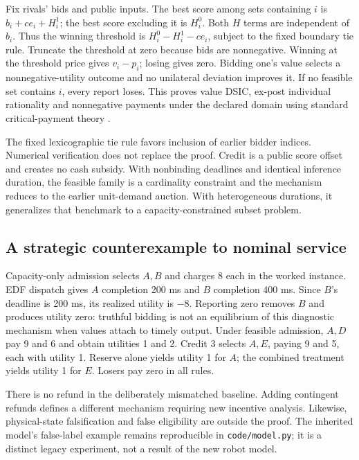 Fix rivals' bids and public inputs. The best score among sets containing $i$ is $b_i+ce_i+H_i^1$; the best score excluding it is $H_i^0$. Both $H$ terms are independent of $b_i$. Thus the winning threshold is $H_i^0-H_i^1-ce_i$, subject to the fixed boundary tie rule. Truncate the threshold at zero because bids are nonnegative. Winning at the threshold price gives $v_i-p_i$; losing gives zero. Bidding one's value selects a nonnegative-utility outcome and no unilateral deviation improves it. If no feasible set contains $i$, every report loses. This proves value DSIC, ex-post individual rationality and nonnegative payments under the declared domain using standard critical-payment theory \cite{roughgarden}.

The fixed lexicographic tie rule favors inclusion of earlier bidder indices. Numerical verification does not replace the proof. Credit is a public score offset and creates no cash subsidy. With nonbinding deadlines and identical inference duration, the feasible family is a cardinality constraint and the mechanism reduces to the earlier unit-demand auction. With heterogeneous durations, it generalizes that benchmark to a capacity-constrained subset problem.

\subsection{A strategic counterexample to nominal service}
Capacity-only admission selects $A,B$ and charges 8 each in the worked instance. EDF dispatch gives $A$ completion 200 ms and $B$ completion 400 ms. Since $B$'s deadline is 200 ms, its realized utility is $-8$. Reporting zero removes $B$ and produces utility zero: truthful bidding is not an equilibrium of this diagnostic mechanism when values attach to timely output. Under feasible admission, $A,D$ pay 9 and 6 and obtain utilities 1 and 2. Credit 3 selects $A,E$, paying 9 and 5, each with utility 1. Reserve alone yields utility 1 for $A$; the combined treatment yields utility 1 for $E$. Losers pay zero in all rules.

There is no refund in the deliberately mismatched baseline. Adding contingent refunds defines a different mechanism requiring new incentive analysis. Likewise, physical-state falsification and false eligibility are outside the proof. The inherited model's false-label example remains reproducible in \texttt{code/model.py}; it is a distinct legacy experiment, not a result of the new robot model.

